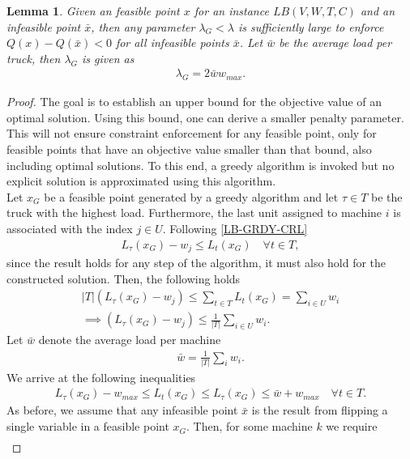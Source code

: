 \documentclass[12pt]{article}
\newtheorem{lemma}[theorem]{Lemma}
\begin{document}
\begin{lemma}
Given an feasible point $x$ for an instance $LB(V, W, T, C)$ and an infeasible point $\bar{x}$, then any parameter $\lambda_{G}<\lambda$ is sufficiently large to enforce $Q(x) - Q(\bar{x}) < 0$ for all infeasible points $\bar{x}$. 
Let $\bar{w}$ be the average load per truck, then $\lambda_{G}$ is given as
\begin{gather*}
\lambda_{G} = 2 \bar{w} w_{max}.
\end{gather*}
\end{lemma}
\begin{proof}
The goal is to establish an upper bound for the objective value of an optimal solution.
Using this bound, one can derive a smaller penalty parameter.
This will not ensure constraint enforcement for any feasible point, only for feasible points that have an objective value smaller than that bound, also including optimal solutions.
To this end, a greedy algorithm is invoked but no explicit solution is approximated using this algorithm.
\\
Let $x_G$ be a feasible point generated by a greedy algorithm and let $\tau \in T$ be the truck with the highest load.
Furthermore, the last unit assigned to machine $i$ is associated with the index $j \in U$.
Following \ref{LB-GRDY-CRL}
\begin{gather*}
L_{\tau}(x_G) - w_j \leq L_{t}(x_G) \quad \forall t \in T,
\end{gather*}
since the result holds for any step of the algorithm, it must also hold for the constructed solution.
Then, the following holds
\begin{gather*}
|T| (L_{\tau}(x_G) - w_j) \leq \sum_{t \in T} L_{t}(x_G) = \sum_{i \in U} w_i \\
\implies (L_{\tau}(x_G) - w_j) \leq \frac{1}{|T|} \sum_{i \in U} w_i.
\end{gather*}
Let $\bar{w}$ denote the average load per machine
\begin{gather*}
\bar{w} = \frac{1}{|T|} \sum_{i} w_i.
\end{gather*}
We arrive at the following inequalities
\begin{gather*}
L_{\tau}(x_G) - w_{max} \leq L_{t}(x_G) \leq L_{\tau}(x_G) \leq \bar{w} + w_{max} \quad \forall t \in T.
\end{gather*}
As before, we assume that any infeasible point $\bar{x}$ is the result from flipping a single variable in a feasible point $x_G$.
Then, for some machine $k$ we require 
\begin{gather*}

\end{gather*}
\end{proof}
\end{document}
